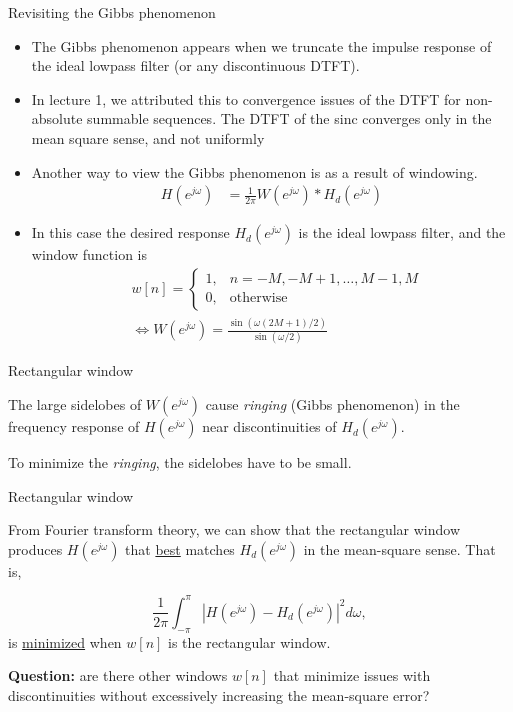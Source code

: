 \documentclass[10pt]{beamer}
\begin{document}
\begin{frame}{Revisiting the Gibbs phenomenon}
\begin{itemize}
	\item The Gibbs phenomenon appears when we truncate the impulse response of the ideal lowpass filter (or any discontinuous DTFT). 
	\item In lecture 1, we attributed this to convergence issues of the DTFT for non-absolute summable sequences. The DTFT of the sinc converges only in the mean square sense, and not uniformly
	\item Another way to view the Gibbs phenomenon is as a result of windowing.
\begin{align*}
H(e^{j\omega}) &= \frac{1}{2\pi}W(e^{j\omega}) \ast H_d(e^{j\omega}) \tag{convolution}
\end{align*}
	\item In this case the desired response $H_d(e^{j\omega})$ is the ideal lowpass filter, and the window function is
	\begin{align*}
	&w[n] = \begin{cases}
	1, & n = -M, -M+1, \ldots, M-1, M \\
	0, & \text{otherwise} 
	\end{cases} \\
	&\Longleftrightarrow W(e^{j\omega}) = \frac{\sin(\omega(2M+1)/2)}{\sin(\omega/2)}
	\end{align*}
\end{itemize}
\end{frame}

\begin{frame}{Rectangular window}
\begin{center}
	\resizebox{0.6\linewidth}{!}{}
\end{center}

The large sidelobes of $W(e^{j\omega})$ cause \textit{ringing} (Gibbs phenomenon) in the frequency response of $H(e^{j\omega})$ near discontinuities of $H_d(e^{j\omega})$.

To minimize the \textit{ringing}, the sidelobes have to be small. 
\end{frame}

\begin{frame}{Rectangular window}

From Fourier transform theory, we can show that the rectangular window produces $H(e^{j\omega})$ that \underline{best} matches $H_d(e^{j\omega})$ in the mean-square sense. That is,

\begin{equation*}
\frac{1}{2\pi}\int_{-\pi}^{\pi}|H(e^{j\omega}) - H_d(e^{j\omega})|^2d\omega, \tag{mean-square error}
\end{equation*}
is \underline{minimized} when $w[n]$ is the rectangular window.

\textbf{Question:} are there other windows $w[n]$ that minimize issues with discontinuities without excessively increasing the mean-square error?
\end{frame}
\end{document}
